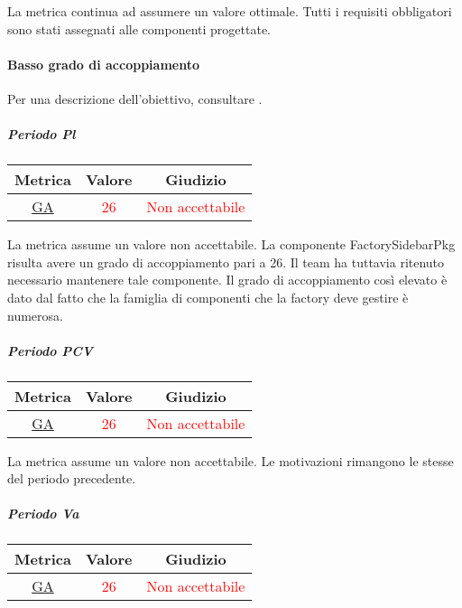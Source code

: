 				La metrica continua ad assumere un valore ottimale. Tutti i requisiti obbligatori sono stati assegnati alle componenti progettate.
				
				\newpage
				\paragraph{Basso grado di accoppiamento}
					Per una descrizione dell'obiettivo, consultare .
					\subparagraph{Periodo Pl}
					
					\begin{table}[H]
						\centering
						\begin{tabular}{  c | c | c}
							\hline
							\textbf{Metrica} & \textbf{Valore} & \textbf{Giudizio} \\
							\hline
							 \hyperref[MMC]{GA}   & \textcolor{Red}{26}          & \textcolor{Red}{Non accettabile} \\ \hline
						\end{tabular} 
					\end{table}
				
				La metrica assume un valore non accettabile. La componente FactorySidebarPkg risulta avere un grado di accoppiamento pari a 26. Il team ha tuttavia ritenuto necessario mantenere tale componente. Il grado di accoppiamento così elevato è dato dal fatto che la famiglia di componenti che la factory deve gestire è numerosa.
				
					\subparagraph{Periodo PCV}
				
				\begin{table}[H]
					\centering
					\begin{tabular}{  c | c | c}
						\hline
						\textbf{Metrica} & \textbf{Valore} & \textbf{Giudizio} \\
						\hline
						\hyperref[MMC]{GA}   & \textcolor{Red}{26}          & \textcolor{Red}{Non accettabile} \\ \hline
					\end{tabular} 
				\end{table}
				
				La metrica assume un valore non accettabile. Le motivazioni rimangono le stesse del periodo precedente.
				
				\subparagraph{Periodo Va}
				
				\begin{table}[H]
					\centering
					\begin{tabular}{  c | c | c}
						\hline
						\textbf{Metrica} & \textbf{Valore} & \textbf{Giudizio} \\
						\hline
						\hyperref[MMC]{GA}   & \textcolor{Red}{26}          & \textcolor{Red}{Non accettabile} \\ \hline
					\end{tabular} 
				\end{table}
				
